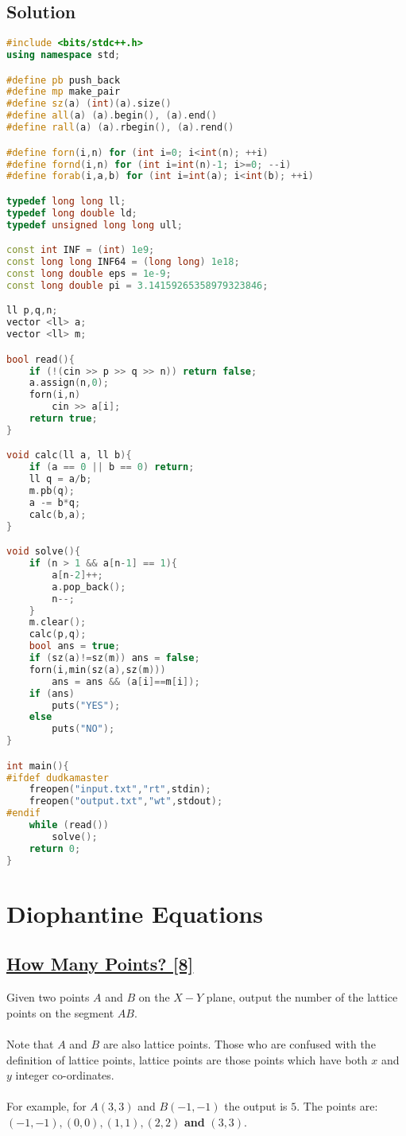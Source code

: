 \documentclass[10pt,a4paper]{article}
\begin{document}
\begin{itemize}
\subsection*{Solution}
\begin{lstlisting}[language=C++, caption={Continued Fractions},label={1st:code}, mathescape=true, breaklines=true]
#include <bits/stdc++.h>
using namespace std;

#define pb push_back
#define mp make_pair
#define sz(a) (int)(a).size()
#define all(a) (a).begin(), (a).end()
#define rall(a) (a).rbegin(), (a).rend()

#define forn(i,n) for (int i=0; i<int(n); ++i)
#define fornd(i,n) for (int i=int(n)-1; i>=0; --i)
#define forab(i,a,b) for (int i=int(a); i<int(b); ++i)

typedef long long ll;
typedef long double ld;
typedef unsigned long long ull;

const int INF = (int) 1e9;
const long long INF64 = (long long) 1e18;
const long double eps = 1e-9;
const long double pi = 3.14159265358979323846;

ll p,q,n;
vector <ll> a;
vector <ll> m;

bool read(){
    if (!(cin >> p >> q >> n)) return false;
    a.assign(n,0);
    forn(i,n)
        cin >> a[i];
    return true;
}

void calc(ll a, ll b){
    if (a == 0 || b == 0) return;
    ll q = a/b;
    m.pb(q);
    a -= b*q;
    calc(b,a);
}

void solve(){
    if (n > 1 && a[n-1] == 1){
        a[n-2]++;
        a.pop_back();
        n--;
    }
    m.clear();
    calc(p,q);
    bool ans = true;
    if (sz(a)!=sz(m)) ans = false;
    forn(i,min(sz(a),sz(m)))
        ans = ans && (a[i]==m[i]);
    if (ans)
        puts("YES");
    else
        puts("NO");
}

int main(){
#ifdef dudkamaster
    freopen("input.txt","rt",stdin);
    freopen("output.txt","wt",stdout);
#endif
    while (read())
        solve();
    return 0;
}

\end{lstlisting}
\section{Diophantine Equations}

\subsection*{\href{https://lightoj.com/problem/how-many-points}{\underline{How Many Points? [8]}}} 
Given two points $A$ and $B$ on the $X-Y$ plane, output the number of the lattice points on the segment $AB$.
\\ \\
Note that $A$ and $B$ are also lattice points. Those who are confused with the definition of lattice points, lattice points are those points which have both $x$ and $y$ integer co-ordinates.
\\ \\
For example, for $A (3, 3)$ and $B (-1, -1)$ the output is $5$. The points are: $(-1, -1), (0, 0), (1, 1), (2, 2)$ \textbf{and} $(3, 3)$.


\end{itemize}
\end{document}
